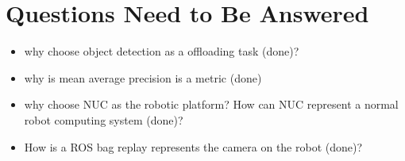 \chapter{Questions Need to Be Answered}

\begin{itemize}
    \item why choose object detection as a offloading task (done)? 
    \item why is mean average precision is a metric (done)
    \item why choose NUC as the robotic platform? How can NUC represent a normal robot computing system (done)? 
    \item How is a ROS bag replay represents the camera on the robot (done)?
\end{itemize}